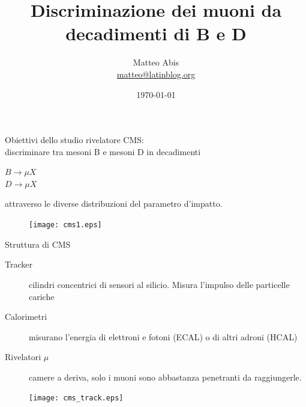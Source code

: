 \documentclass[italian]{beamer}
\title{Discriminazione dei muoni da decadimenti di B e D}
\author{Matteo Abis \\
\url{matteo@latinblog.org}}
\institute{Università degli Studi di Padova\\
Scuola Galileiana di Studi Superiori}
\date{\today}
\begin{document}
\begin{frame}
    \titlepage
\end{frame}

\begin{frame}
    {Obiettivi dello studio}
    rivelatore CMS:\\
    discriminare tra mesoni B e mesoni D in decadimenti\\
    \begin{center}
        $B \to \mu X$\\
        $D \to \mu X$
    \end{center}
    attraverso le diverse distribuzioni del parametro d'impatto.
\end{frame}

\begin{frame}
    \begin{figure}[h]
        \begin{center}
            \texttt{[image: cms1.eps]}
        \end{center}
    \end{figure}
\end{frame}

\begin{frame}{Struttura di CMS}
    \begin{description}
        \item[Tracker] cilindri concentrici di sensori al silicio. Misura
            l'impulso delle particelle cariche
        \item[Calorimetri] misurano l'energia di elettroni e fotoni (ECAL) o
            di altri adroni (HCAL) 
        \item[Rivelatori $\mu$] camere a deriva, solo i muoni sono abbastanza
            penetranti da raggiungerle.
    \end{description}
    \begin{figure}[h]
        \begin{center}
            \texttt{[image: cms\_track.eps]}
        \end{center}
    \end{figure}
\end{frame}
\end{document}
